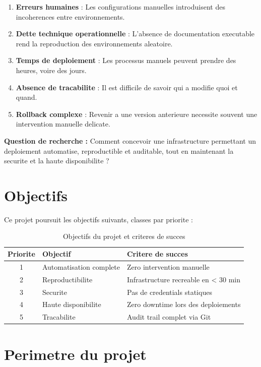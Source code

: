 \documentclass[12pt,a4paper,french]{report}
\begin{document}
\begin{enumerate}
    \item \textbf{Erreurs humaines} : Les configurations manuelles introduisent des incoherences entre environnements.
    \item \textbf{Dette technique operationnelle} : L'absence de documentation executable rend la reproduction des environnements aleatoire.
    \item \textbf{Temps de deploiement} : Les processus manuels peuvent prendre des heures, voire des jours.
    \item \textbf{Absence de tracabilite} : Il est difficile de savoir qui a modifie quoi et quand.
    \item \textbf{Rollback complexe} : Revenir a une version anterieure necessite souvent une intervention manuelle delicate.
\end{enumerate}

\textbf{Question de recherche :} Comment concevoir une infrastructure permettant un deploiement automatise, reproductible et auditable, tout en maintenant la securite et la haute disponibilite ?

\section{Objectifs}

Ce projet poursuit les objectifs suivants, classes par priorite :

\begin{table}[H]
    \centering
    \begin{tabular}{|c|l|l|}
        \hline
        \textbf{Priorite} & \textbf{Objectif} & \textbf{Critere de succes} \\
        \hline
        1 & Automatisation complete & Zero intervention manuelle \\
        2 & Reproductibilite & Infrastructure recreable en < 30 min \\
        3 & Securite & Pas de credentials statiques \\
        4 & Haute disponibilite & Zero downtime lors des deploiements \\
        5 & Tracabilite & Audit trail complet via Git \\
        \hline
    \end{tabular}
    \caption{Objectifs du projet et criteres de succes}
    \label{table:objectifs}
\end{table}

\section{Perimetre du projet}
\end{document}
